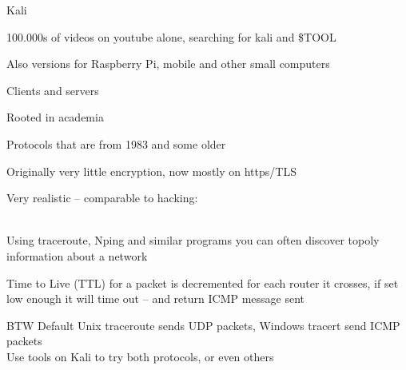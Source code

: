 \documentclass[Screen16to9,17pt]{foils}
\begin{document}


\begin{list1}
\item  Kali 
\item 100.000s of videos on youtube alone, searching for kali and \$TOOL
\item Also versions for Raspberry Pi, mobile and other small computers
\end{list1}







\begin{list1}
\item Clients and servers
\item Rooted in academia
\item Protocols that are from 1983 and some older
\item Originally very little encryption, now mostly on https/TLS
\end{list1}


Very realistic -- comparable to hacking:\\
\\





\begin{list2}
\item Using traceroute, Nping and similar programs you can often discover topoly information about a network
\item Time to Live (TTL) for a packet is decremented for each router it crosses, if set low enough it will time out -- and return ICMP message sent
\item BTW Default Unix traceroute sends UDP packets, Windows tracert send ICMP packets\\
Use tools on Kali to try both protocols, or even others
\end{list2}
\end{document}
